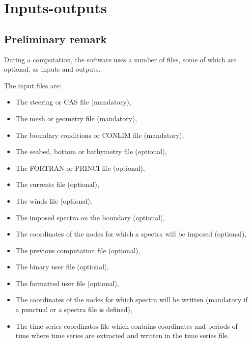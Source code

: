 \chapter{ Inputs-outputs}

\section{ Preliminary remark}

During a computation, the \tomawac software uses a number of files, some of which are
optional, as inputs and outputs.

 The input files are:

\begin{itemize}
\item  The steering or CAS file (mandatory),

\item  The mesh or geometry file (mandatory),

\item  The boundary conditions or CONLIM file (mandatory),

\item  The seabed, bottom or bathymetry file (optional),

\item  The FORTRAN or PRINCI file (optional),

\item  The currents file (optional),

\item  The winds file (optional),

\item The imposed spectra on the boundary (optional),

\item The coordinates of the nodes for which a spectra will be imposed (optional),

\item  The previous computation file (optional),

\item  The binary user file (optional),

\item  The formatted user file (optional),

\item The coordinates of the nodes for which spectra will be written (mandatory if a
  punctual or a spectra file is defined),

\item The time series coordinates file which contains coordinates and periods of
  time where time series are extracted and written in the time series file.
\end{itemize}

